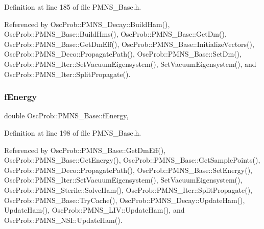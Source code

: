 Definition at line 185 of file P\+M\+N\+S\+\_\+\+Base.\+h.



Referenced by Osc\+Prob\+::\+P\+M\+N\+S\+\_\+\+Decay\+::\+Build\+Ham(), Osc\+Prob\+::\+P\+M\+N\+S\+\_\+\+Base\+::\+Build\+Hms(), Osc\+Prob\+::\+P\+M\+N\+S\+\_\+\+Base\+::\+Get\+Dm(), Osc\+Prob\+::\+P\+M\+N\+S\+\_\+\+Base\+::\+Get\+Dm\+Eff(), Osc\+Prob\+::\+P\+M\+N\+S\+\_\+\+Base\+::\+Initialize\+Vectors(), Osc\+Prob\+::\+P\+M\+N\+S\+\_\+\+Deco\+::\+Propagate\+Path(), Osc\+Prob\+::\+P\+M\+N\+S\+\_\+\+Base\+::\+Set\+Dm(), Osc\+Prob\+::\+P\+M\+N\+S\+\_\+\+Iter\+::\+Set\+Vacuum\+Eigensystem(), Set\+Vacuum\+Eigensystem(), and Osc\+Prob\+::\+P\+M\+N\+S\+\_\+\+Iter\+::\+Split\+Propagate().

\mbox{\label{classOscProb_1_1PMNS__Base_a2800af6d436972f3e900867790c046b0}} 
\subsubsection{\texorpdfstring{f\+Energy}{fEnergy}}
{\footnotesize\ttfamily double Osc\+Prob\+::\+P\+M\+N\+S\+\_\+\+Base\+::f\+Energy\hspace{0.3cm}{\ttfamily [protected]}, {\ttfamily [inherited]}}



Definition at line 198 of file P\+M\+N\+S\+\_\+\+Base.\+h.



Referenced by Osc\+Prob\+::\+P\+M\+N\+S\+\_\+\+Base\+::\+Get\+Dm\+Eff(), Osc\+Prob\+::\+P\+M\+N\+S\+\_\+\+Base\+::\+Get\+Energy(), Osc\+Prob\+::\+P\+M\+N\+S\+\_\+\+Base\+::\+Get\+Sample\+Points(), Osc\+Prob\+::\+P\+M\+N\+S\+\_\+\+Deco\+::\+Propagate\+Path(), Osc\+Prob\+::\+P\+M\+N\+S\+\_\+\+Base\+::\+Set\+Energy(), Osc\+Prob\+::\+P\+M\+N\+S\+\_\+\+Iter\+::\+Set\+Vacuum\+Eigensystem(), Set\+Vacuum\+Eigensystem(), Osc\+Prob\+::\+P\+M\+N\+S\+\_\+\+Sterile\+::\+Solve\+Ham(), Osc\+Prob\+::\+P\+M\+N\+S\+\_\+\+Iter\+::\+Split\+Propagate(), Osc\+Prob\+::\+P\+M\+N\+S\+\_\+\+Base\+::\+Try\+Cache(), Osc\+Prob\+::\+P\+M\+N\+S\+\_\+\+Decay\+::\+Update\+Ham(), Update\+Ham(), Osc\+Prob\+::\+P\+M\+N\+S\+\_\+\+L\+I\+V\+::\+Update\+Ham(), and Osc\+Prob\+::\+P\+M\+N\+S\+\_\+\+N\+S\+I\+::\+Update\+Ham().

\mbox{\label{classOscProb_1_1PMNS__Base_a6319c34d7decbb9d7d6da279c06e8c2d}} 
